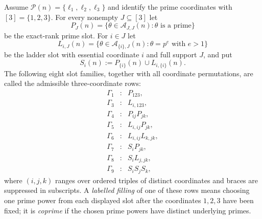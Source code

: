 \begin{definition}
\label{def:three-coordinate-slot-construction}
Assume $\mathcal P(n)=\{\ell_1,\ell_2,\ell_3\}$ and identify the prime
coordinates with $[3]=\{1,2,3\}$.  For every nonempty
$J\subseteq[3]$ let
\[
P_J(n)=\{\theta\in\mathcal A_{J,J}(n):\theta\text{ is a prime}\}
\]
be the exact-rank prime slot. For $i\in J$ let
\[
L_{i,J}(n)=\{\theta\in\mathcal A_{\{i\},J}(n):
\theta=p^e\text{ with }e>1\}
\]
be the ladder slot with essential coordinate $i$ and full support $J$, and put
\[
S_i(n):=P_{\{i\}}(n)\cup L_{i,\{i\}}(n).
\]
The following eight slot families, together with all coordinate permutations,
are called the admissible three-coordinate rows:
\[
\begin{array}{ccl}
\Gamma_1&:& P_{123},\\
\Gamma_3&:& L_{i,123},\\
\Gamma_4&:& P_{ij}P_{jk},\\
\Gamma_5&:& L_{i,ij}P_{jk},\\
\Gamma_6&:& L_{i,ij}L_{k,jk},\\
\Gamma_7&:& S_iP_{jk},\\
\Gamma_8&:& S_iL_{j,jk},\\
\Gamma_9&:& S_iS_jS_k,
\end{array}
\]
where $(i,j,k)$ ranges over ordered triples of distinct coordinates and braces
are suppressed in subscripts.  A \emph{labelled filling} of one of these rows
means choosing one prime power from each displayed slot after the coordinates
$1,2,3$ have been fixed; it is \emph{coprime} if the chosen prime powers have
distinct underlying primes.
\end{definition}

